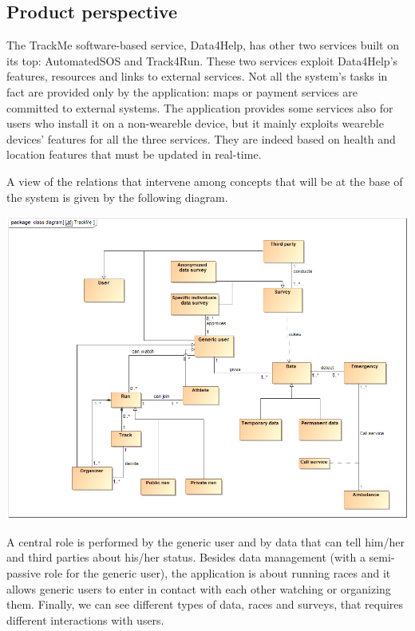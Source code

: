 
%

\subsection{Product perspective}
The TrackMe software-based service, Data4Help, has  other two services built on its top: AutomatedSOS and Track4Run. These two services exploit Data4Help's features, resources and links to external services. Not all the system's tasks in fact are provided only by the application: maps or payment services are committed to external systems. The application provides some services also for users who install it on a non-weareble device, but it mainly exploits weareble devices' features for all the three services. They are indeed based on health and location features that must be updated in real-time. \newline

A view of the relations that intervene among concepts that will be at the base of the system is given by the following diagram.

\begin{center}
\includegraphics[scale=0.5]{sections/diagrams/class_diagram.png} \newline
{}
\end{center}

A central role is performed by the generic user and by data that can tell him/her and third parties about his/her status. Besides data management (with a semi-passive role for the generic user), the application is about running races and it allows generic users to enter in contact with each other watching or organizing them. Finally, we can see different types of data, races and surveys, that requires different interactions with users.

